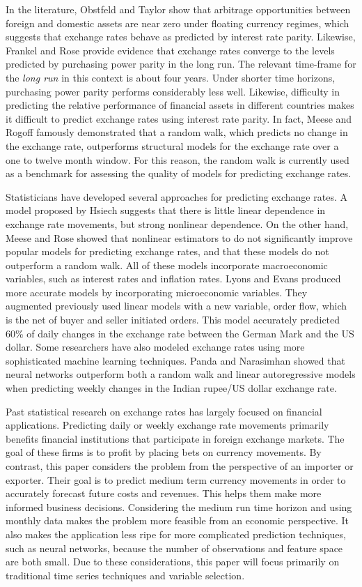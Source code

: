 \documentclass{sig-alternate-05-2015}
\begin{document}
\par{} In the literature, Obstfeld and Taylor show that arbitrage opportunities between foreign and domestic assets are near zero under floating currency regimes, which suggests that exchange rates behave as predicted by interest rate parity. Likewise, Frankel and Rose provide evidence that exchange rates converge to the levels predicted by purchasing power parity in the long run. The relevant time-frame for the \emph{long run} in this context is about four years. Under shorter time horizons, purchasing power parity performs considerably less well. Likewise, difficulty in predicting the relative performance of financial assets in different countries makes it difficult to predict exchange rates using interest rate parity. In fact, Meese and Rogoff famously demonstrated that a random walk, which predicts no change in the exchange rate, outperforms structural models for the exchange rate over a one to twelve month window. For this reason, the random walk is currently used as a benchmark for assessing the quality of models for predicting exchange rates.
\par{} Statisticians have developed several approaches for predicting exchange rates. A model proposed by Hsiech suggests that there is little linear dependence in exchange rate movements, but strong nonlinear dependence. On the other hand, Meese and Rose showed that nonlinear estimators to do not significantly improve popular models for predicting exchange rates, and that these models do not outperform a random walk. All of these models incorporate macroeconomic variables, such as interest rates and inflation rates. Lyons and Evans produced more accurate models by incorporating microeconomic variables. They augmented previously used linear models with a new variable, order flow, which is the net of buyer and seller initiated orders. This model accurately predicted 60\% of daily changes in the exchange rate between the German Mark and the US dollar. Some researchers have also modeled exchange rates using more sophisticated machine learning techniques. Panda and Narasimhan showed that neural networks outperform both a random walk and linear autoregressive models when predicting weekly changes in the Indian rupee/US dollar exchange rate.
\par{} Past statistical research on exchange rates has largely focused on financial applications. Predicting daily or weekly exchange rate movements primarily benefits financial institutions that participate in foreign exchange markets. The goal of these firms is to profit by placing bets on currency movements. By contrast, this paper considers the problem from the perspective of an importer or exporter. Their goal is to predict medium term currency movements in order to accurately forecast future costs and revenues. This helps them make more informed business decisions. Considering the medium run time horizon and using monthly data makes the problem more feasible from an economic perspective. It also makes the application less ripe for more complicated prediction techniques, such as neural networks, because the number of observations and feature space are both small. Due to these considerations, this paper will focus primarily on traditional time series techniques and variable selection.
\end{document}
